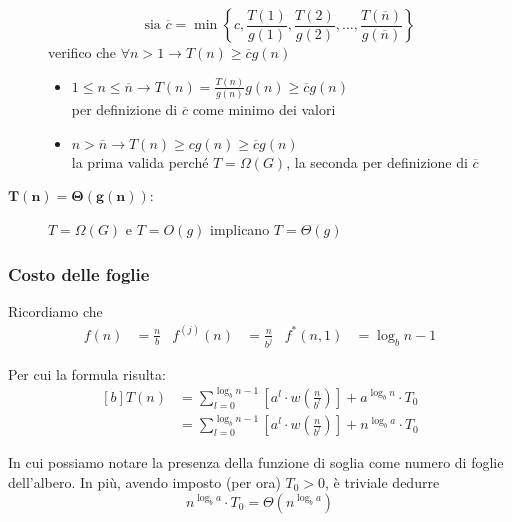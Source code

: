 \begin{description}
        $$ \text{sia } \overline{c} = \min \left\{ c, \frac{T(1)}{g(1)}, \frac{T(2)}{g(2)} ,
            \dots, \frac{T( \overline{n})}{ g( \overline{n}) } \right\} $$
        verifico che $ \forall n>1 \rightarrow T(n) \geq \overline{c} g(n) $
        \begin{itemize}[noitemsep,topsep=0pt,parsep=0pt,partopsep=0pt]
            \item $1 \leq n \leq \overline{n} \rightarrow T(n) = \frac{T(n)}{g(n)}g(n) \geq \overline{c}g(n) $ \\
                per definizione di $ \overline{c} $ come minimo dei valori
            \item $ n > \overline{n} \rightarrow T(n) \geq cg(n) \geq \overline{c}g(n)$ \\
                la prima valida perché $T=\Omega(G)$, la seconda per definizione di $\overline{c}$
        \end{itemize}
    \item[$\bm{T(n)=\Theta \left( g(n) \right)}$:] $T=\Omega(G)$ e $T=O(g)$ implicano $T=\Theta(g)$
\end{description}

\subsubsection{Costo delle foglie}
Ricordiamo che 
\begin{align*}
    f(n)&= \frac{n}{b} & f^{(j)}(n) &= \frac{n}{b^j} & f^*(n,1) &= \log_b n -1
\end{align*}

Per cui la formula risulta:
\begin{equation}
    \begin{aligned}[b]
        T(n) &= \sum_{l=0}^{\log_b n -1} \left[ a^l \cdot w \left( \frac{n}{b^l} \right) \right] + a^{\log_b n} \cdot T_0 \\
        &= \sum_{l=0}^{\log_b n -1} \left[ a^l \cdot w \left( \frac{n}{b^l} \right) \right] + n^{\log_b a} \cdot T_0
        \label{eq:masterchiusa1}
    \end{aligned}
\end{equation}

In cui possiamo notare la presenza della funzione di soglia come numero di foglie dell'albero. In più, avendo imposto (per ora) $T_0>0$, è triviale dedurre \begin{equation}
    n^{\log_b a} \cdot T_0 = \Theta \left( n^{\log_b a} \right) 
    \label{eq:masterfoglie}
\end{equation}

